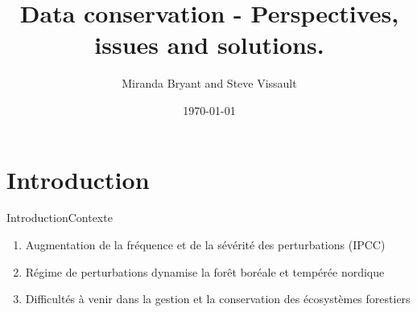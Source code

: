 \documentclass{eecslides}
\title[Data Storage]{Data conservation - Perspectives, issues and solutions.}
\author[M. Bryant and S. Vissault]{\color{white}  Miranda Bryant and Steve Vissault}
\institute[\color{white} UQAR]{\color{white} \textbf{Les midis numériques}}
\date{ \color{white} \today}
\begin{document}
\begin{frame}[plain]
\titlepage
\end{frame}


\section{Introduction}

\begin{frame}{Introduction}{Contexte}

\begin{enumerate} 
	\item Augmentation de la fréquence et de la sévérité des perturbations (IPCC)
	\item Régime de perturbations dynamise la forêt boréale et tempérée nordique
	\item Difficultés à venir dans la gestion et la conservation des écosystèmes forestiers
\end{enumerate}

\end{frame}





%	
%		
\end{document}
